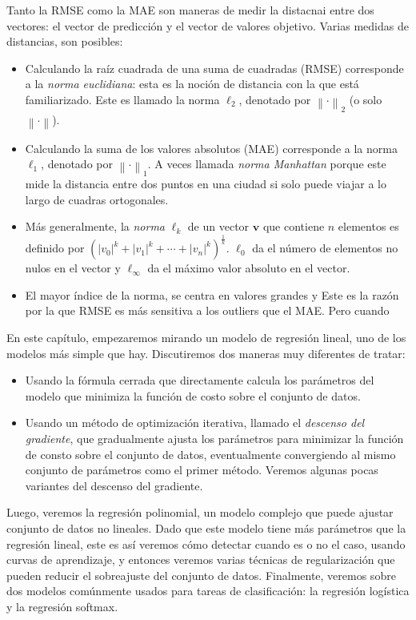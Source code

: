 Tanto la RMSE como la MAE son maneras de medir la distacnai entre dos vectores: el vector de predicción y el vector de valores objetivo. Varias medidas de distancias, son posibles:
\begin{itemize}
	\item Calculando la raíz cuadrada de una suma de cuadradas (RMSE) corresponde a la \emph{norma euclidiana}: esta es la noción de distancia con la que está familiarizado. Este es llamado la norma $\ell_{2}$, denotado por $\left\|\cdot\right\|_{2}$ (o solo $\left\|\cdot\right \|$).
	\item Calculando la suma de los valores absolutos (MAE) corresponde a la norma $\ell_{1}$, denotado por $\left\|\cdot\right\|_{1}$. A veces llamada \emph{norma Manhattan} porque este mide la distancia entre dos puntos en una ciudad si solo puede viajar a lo largo de cuadras ortogonales.
	\item Más generalmente, la \emph{norma} $\ell_{k}$ de un vector $\bm{v}$ que contiene $n$ elementos es definido por ${\left({\left|v_{0}\right|}^{k}+{\left|v_{1}\right|}^{k}+\cdots+{\left|v_{n}\right|}^{k}\right)}^{\frac{1}{k}}$. $\ell_{0}$ da el número de elementos no nulos en el vector y $\ell_{\infty}$ da el máximo valor absoluto en el vector.
	\item El mayor índice de la norma, %
	se centra en valores grandes y %
	Este es la razón por la que RMSE es más sensitiva a los outliers que el MAE. Pero cuando
\end{itemize}

En este capítulo, empezaremos mirando un modelo de regresión lineal, uno de los modelos más simple que hay. Discutiremos dos maneras muy diferentes de tratar:
\begin{itemize}
	\item Usando la fórmula cerrada que directamente calcula los parámetros del modelo que minimiza la función de costo sobre el conjunto de datos.
	\item Usando un método de optimización iterativa, llamado el \emph{descenso del gradiente}, que gradualmente ajusta los parámetros para minimizar la función de consto sobre el conjunto de datos, eventualmente convergiendo al mismo conjunto de parámetros como el primer método. Veremos algunas pocas variantes del descenso del gradiente.
\end{itemize}
Luego, veremos la regresión polinomial, un modelo complejo que puede ajustar conjunto de datos no lineales. Dado que este modelo tiene más parámetros que la regresión lineal, este es %
así veremos cómo detectar cuando es o no el caso, usando curvas de aprendizaje, y entonces veremos varias técnicas de regularización que pueden reducir el sobreajuste del conjunto de datos. Finalmente, veremos sobre dos modelos comúnmente usados para tareas de clasificación: la regresión logística y la regresión softmax.


